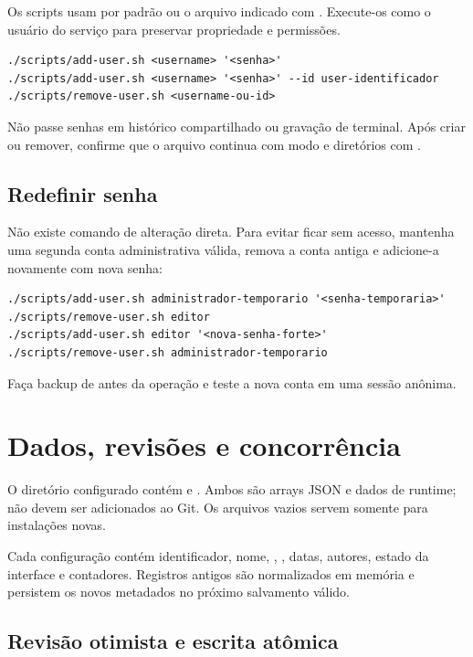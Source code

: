 Os scripts usam  por padrão ou o arquivo indicado com . Execute-os como o usuário do serviço para preservar propriedade e permissões.

\begin{lstlisting}
./scripts/add-user.sh <username> '<senha>'
./scripts/add-user.sh <username> '<senha>' --id user-identificador
./scripts/remove-user.sh <username-ou-id>
\end{lstlisting}

Não passe senhas em histórico compartilhado ou gravação de terminal. Após criar ou remover, confirme que o arquivo continua com modo  e diretórios com .

\section{Redefinir senha}

Não existe comando de alteração direta. Para evitar ficar sem acesso, mantenha uma segunda conta administrativa válida, remova a conta antiga e adicione-a novamente com nova senha:

\begin{lstlisting}
./scripts/add-user.sh administrador-temporario '<senha-temporaria>'
./scripts/remove-user.sh editor
./scripts/add-user.sh editor '<nova-senha-forte>'
./scripts/remove-user.sh administrador-temporario
\end{lstlisting}

Faça backup de  antes da operação e teste a nova conta em uma sessão anônima.

\chapter{Dados, revisões e concorrência}

O diretório configurado contém  e . Ambos são arrays JSON e dados de runtime; não devem ser adicionados ao Git. Os arquivos  vazios servem somente para instalações novas.

Cada configuração contém identificador, nome, , , datas, autores, estado da interface e contadores. Registros antigos são normalizados em memória e persistem os novos metadados no próximo salvamento válido.

\section{Revisão otimista e escrita atômica}

